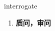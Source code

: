 
\begin{frame}
{\huge interrogate}
\begin{center}
\begin{enumerate}\Large
  \item \textbf{质问，审问}
\end{enumerate}
\end{center}
\end{frame}
